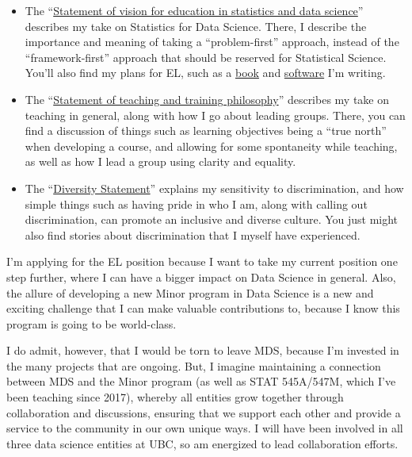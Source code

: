\documentclass[]{article}
\providecommand{\tightlist}{%
  \setlength{\itemsep}{0pt}\setlength{\parskip}{0pt}}
\begin{document}
\begin{itemize}
\tightlist
\item
  The ``\protect\hyperlink{statement-of-vision-for-education-in-statistics-and-data-science}{Statement of vision for education in statistics and data science}'' describes my take on Statistics for Data Science. There, I describe the importance and meaning of taking a ``problem-first'' approach, instead of the ``framework-first'' approach that should be reserved for Statistical Science. You'll also find my plans for EL, such as a \href{https://interpreting-regression.netlify.com/}{book} and \href{https://github.com/vincenzocoia/distplyr/}{software} I'm writing.
\item
  The ``\protect\hyperlink{statement-of-teaching-and-training-philosophy}{Statement of teaching and training philosophy}'' describes my take on teaching in general, along with how I go about leading groups. There, you can find a discussion of things such as learning objectives being a ``true north'' when developing a course, and allowing for some spontaneity while teaching, as well as how I lead a group using clarity and equality.
\item
  The ``\protect\hyperlink{diversity-statement}{Diversity Statement}'' explains my sensitivity to discrimination, and how simple things such as having pride in who I am, along with calling out discrimination, can promote an inclusive and diverse culture. You just might also find stories about discrimination that I myself have experienced.
\end{itemize}

I'm applying for the EL position because I want to take my current position one step further, where I can have a bigger impact on Data Science in general. Also, the allure of developing a new Minor program in Data Science is a new and exciting challenge that I can make valuable contributions to, because I know this program is going to be world-class.

I do admit, however, that I would be torn to leave MDS, because I'm invested in the many projects that are ongoing. But, I imagine maintaining a connection between MDS and the Minor program (as well as STAT 545A/547M, which I've been teaching since 2017), whereby all entities grow together through collaboration and discussions, ensuring that we support each other and provide a service to the community in our own unique ways. I will have been involved in all three data science entities at UBC, so am energized to lead collaboration efforts.
\end{document}

